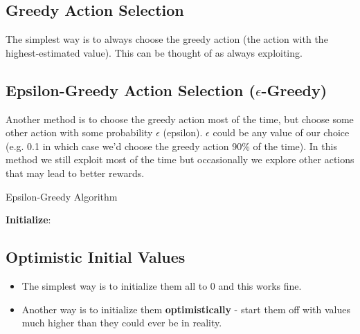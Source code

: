 \subsection{Greedy Action Selection}\label{MAB: Greedy Action Selection}
The simplest way is to always choose the greedy action (the action with the highest-estimated value). This can be thought of as always exploiting.

\subsection{Epsilon-Greedy Action Selection ($\epsilon$-Greedy)}\label{MAB: Epsilon-Greedy Action Selection}
Another method is to choose the greedy action most of the time, but choose some other action with some probability $\epsilon$ (epsilon). $\epsilon$ could be any value of our choice (e.g. 0.1 in which case we’d choose the greedy action 90\% of the time). In this method we still exploit most of the time but occasionally we explore other actions that may lead to better rewards.

\begin{algorithm}
    \caption{Epsilon-Greedy Algorithm}
    \textbf{Initialize}:\\
\end{algorithm}

\subsection{Optimistic Initial Values}
\begin{itemize}
    \item The simplest way is to initialize them all to 0 and this works fine.
    \item Another way is to initialize them \textbf{optimistically} - start them off with values much higher than they could ever be in reality.
\end{itemize}

